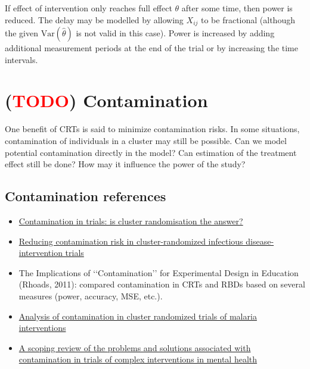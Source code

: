 \documentclass{article}
\newcommand{\Var}{\mathrm{Var}}
\newcommand{\todo}{\textcolor{red}{TODO}}
\begin{document}
If effect of intervention only reaches full effect $\theta$ after some time, then power is reduced. The delay may be modelled by allowing $X_{ij}$ to be fractional (although the given $\Var(\hat{\theta})$ is not valid in this case). Power is increased by adding additional measurement periods at the end of the trial or by increasing the time intervals.


\newpage


\section{(\todo) Contamination}

One benefit of CRTs is said to minimize contamination risks. In some situations, contamination of individuals in a cluster may still be possible. Can we model potential contamination directly in the model? Can estimation of the treatment effect still be done? How may it influence the power of the study?

\subsection{Contamination references}

\begin{itemize}

\item
\href{https://www.ncbi.nlm.nih.gov/pmc/articles/PMC1119583/}{Contamination in trials: is cluster randomisation the answer?}

\item
\href{https://academic.oup.com/ije/article/47/6/2015/5146518}{Reducing contamination risk in cluster-randomized infectious disease-intervention trials}

\item
The Implications of ‘‘Contamination’’ for Experimental Design in Education (Rhoads, 2011): compared contamination in CRTs and RBDs based on several measures (power, accuracy, MSE, etc.).

\item
\href{https://trialsjournal.biomedcentral.com/articles/10.1186/s13063-021-05543-8}{Analysis of contamination in cluster randomized trials of malaria interventions}

\item
\href{https://bmcmedresmethodol.biomedcentral.com/articles/10.1186/s12874-018-0646-z}{A scoping review of the problems and solutions associated with contamination in trials of complex interventions in mental health}

\end{itemize}
\end{document}
